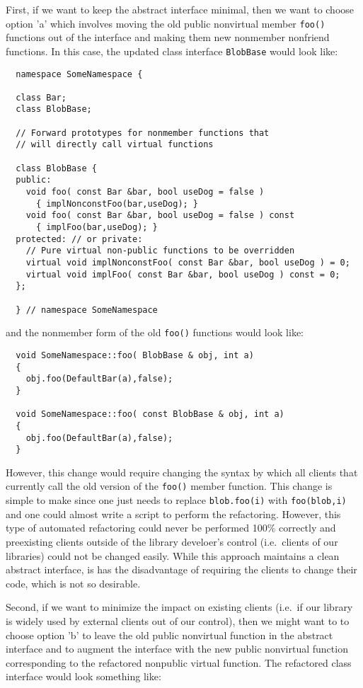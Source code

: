 \documentclass[pdf,ps2pdf,11pt]{SANDreport}
\begin{document}
First, if we want to keep the abstract interface minimal, then we want to
choose option 'a' which involves moving the old public nonvirtual member
{}\texttt{foo()} functions out of the interface and making them new nonmember
nonfriend functions.  In this case, the updated class interface
{}\texttt{BlobBase} would look like:

{\small\begin{verbatim}
  namespace SomeNamespace {

  class Bar;
  class BlobBase;

  // Forward prototypes for nonmember functions that
  // will directly call virtual functions

  class BlobBase {
  public:
    void foo( const Bar &bar, bool useDog = false )
      { implNonconstFoo(bar,useDog); }
    void foo( const Bar &bar, bool useDog = false ) const
      { implFoo(bar,useDog); }
  protected: // or private:
    // Pure virtual non-public functions to be overridden
    virtual void implNonconstFoo( const Bar &bar, bool useDog ) = 0;
    virtual void implFoo( const Bar &bar, bool useDog ) const = 0;
  };

  } // namespace SomeNamespace
\end{verbatim}}

{}\noindent{}and the nonmember form of the old {}\texttt{foo()} functions
would look like:

{\small\begin{verbatim}
  void SomeNamespace::foo( BlobBase & obj, int a)
  {
    obj.foo(DefaultBar(a),false);
  }

  void SomeNamespace::foo( const BlobBase & obj, int a)
  {
    obj.foo(DefaultBar(a),false);
  }
\end{verbatim}}

However, this change would require changing the syntax by which all clients
that currently call the old version of the {}\texttt{foo()} member function.
This change is simple to make since one just needs to replace
{}\texttt{blob.foo(i)} with {}\texttt{foo(blob,i)} and one could almost write
a script to perform the refactoring.  However, this type of automated
refactoring could never be performed 100\% correctly and preexisting clients
outside of the library develoer's control (i.e.\ clients of our libraries)
could not be changed easily.  While this approach maintains a clean abstract
interface, is has the disadvantage of requiring the clients to change their
code, which is not so desirable.

Second, if we want to minimize the impact on existing clients (i.e.\ if our
library is widely used by external clients out of our control), then we might
want to to choose option 'b' to leave the old public nonvirtual function in
the abstract interface and to augment the interface with the new public
nonvirtual function corresponding to the refactored nonpublic virtual
function.  The refactored class interface would look something like:
\end{document}

